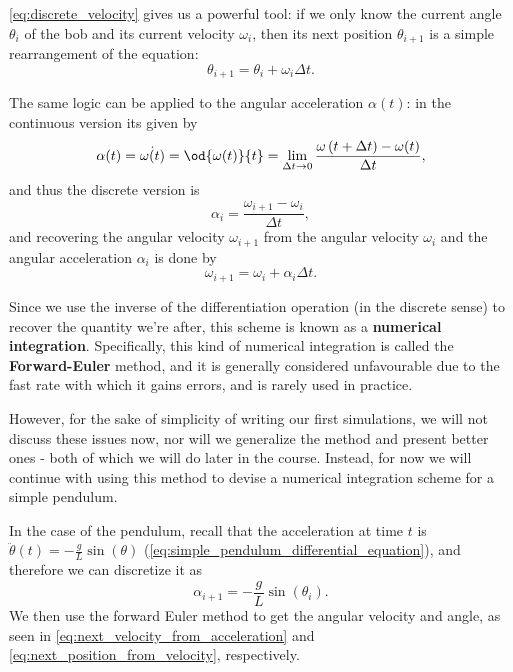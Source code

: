 \autoref{eq:discrete_velocity} gives us a powerful tool: if we only know the current angle $\theta_{i}$ of the bob and its current velocity $\omega_{i}$, then its next position $\theta_{i+1}$ is a simple rearrangement of the equation:
\begin{equation}
	\theta_{i+1} = \theta_{i} + \omega_{i}\Delta t.
	\label{eq:next_position_from_velocity}
\end{equation}

The same logic can be applied to the angular acceleration $\alpha(t)$: in the continuous version its given by
\begin{equation}
	\alpha(t) = \dot{\omega(t)} = \od{\omega(t)}{t} = \lim\limits_{\Delta t\to 0}\frac{\omega\left(t+\Delta t\right)-\omega(t)}{\Delta t},
\end{equation}
and thus the discrete version is
\begin{equation}
	\alpha_{i} = \frac{\omega_{i+1}-\omega_{i}}{\Delta t},
\end{equation}
and recovering the angular velocity $\omega_{i+1}$ from the angular velocity $\omega_{i}$ and the angular acceleration $\alpha_{i}$ is done by
\begin{equation}
	\omega_{i+1} = \omega_{i}+\alpha_{i}\Delta t.
	\label{eq:next_velocity_from_acceleration}
\end{equation}

Since we use the inverse of the differentiation operation (in the discrete sense) to recover the quantity we're after, this scheme is known as a \textbf{numerical integration}. Specifically, this kind of numerical integration is called the \textbf{Forward-Euler} method, and it is generally considered unfavourable due to the fast rate with which it gains errors, and is rarely used in practice.

However, for the sake of simplicity of writing our first simulations, we will not discuss these issues now, nor will we generalize the method and present better ones - both of which we will do later in the course. Instead, for now we will continue with using this method to devise a numerical integration scheme for a simple pendulum.

In the case of the pendulum, recall that the acceleration at time $t$ is $\ddot{\theta}(t)=-\frac{g}{L}\sin(\theta)$ (\autoref{eq:simple_pendulum_differential_equation}), and therefore we can discretize it as
\begin{equation}
	\alpha_{i+1} = -\frac{g}{L}\sin\left(\theta_{i}\right).
	\label{eq:pendulum_discrete_acceleration}
\end{equation}
We then use the forward Euler method to get the angular velocity and angle, as seen in \autoref{eq:next_velocity_from_acceleration} and \autoref{eq:next_position_from_velocity}, respectively.

